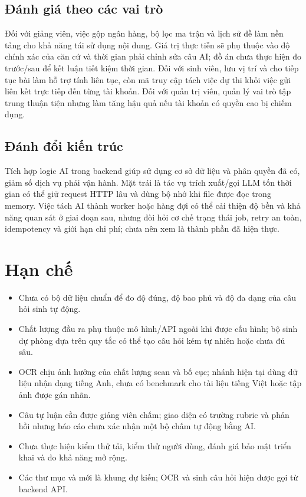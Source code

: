 \subsection{Đánh giá theo các vai trò}
Đối với giảng viên, việc gộp ngân hàng, bộ lọc ma trận và lịch sử đề làm
nền tảng cho khả năng tái sử dụng nội dung. Giá trị thực tiễn sẽ phụ thuộc
vào độ chính xác của căn cứ và thời gian phải chỉnh sửa câu AI; đồ án chưa
thực hiện đo trước/sau để kết luận tiết kiệm thời gian. Đối với sinh viên,
lưu vị trí và cho tiếp tục bài làm hỗ trợ tính liên tục, còn mã truy cập
tách việc dự thi khỏi việc gửi liên kết trực tiếp đến từng tài khoản.
Đối với quản trị viên, quản lý vai trò tập trung thuận tiện nhưng làm tăng
hậu quả nếu tài khoản có quyền cao bị chiếm dụng.

\subsection{Đánh đổi kiến trúc}
Tích hợp logic AI trong backend giúp sử dụng cơ sở dữ liệu và phân quyền
đã có, giảm số dịch vụ phải vận hành. Mặt trái là tác vụ trích xuất/gọi
LLM tốn thời gian có thể giữ request HTTP lâu và dùng bộ nhớ khi file được
đọc trong memory. Việc tách AI thành worker hoặc hàng đợi có thể cải thiện
độ bền và khả năng quan sát ở giai đoạn sau, nhưng đòi hỏi cơ chế trạng
thái job, retry an toàn, idempotency và giới hạn chi phí; chưa nên xem là
thành phần đã hiện thực.

\section{Hạn chế}

\begin{itemize}[leftmargin=1.6em, itemsep=3pt]
  \item Chưa có bộ dữ liệu chuẩn để đo độ đúng, độ bao phủ và độ đa dạng của
        câu hỏi sinh tự động.
  \item Chất lượng đầu ra phụ thuộc mô hình/API ngoài khi được cấu hình; bộ
        sinh dự phòng dựa trên quy tắc có thể tạo câu hỏi kém tự nhiên hoặc
        chưa đủ sâu.
  \item OCR chịu ảnh hưởng của chất lượng scan và bố cục; nhánh hiện tại
        dùng dữ liệu nhận dạng tiếng Anh, chưa có benchmark cho tài liệu
        tiếng Việt hoặc tập ảnh được gán nhãn.
  \item Câu tự luận cần được giảng viên chấm; giao diện có trường rubric và
        phản hồi nhưng báo cáo chưa xác nhận một bộ chấm tự động bằng AI.
  \item Chưa thực hiện kiểm thử tải, kiểm thử người dùng, đánh giá bảo mật
        triển khai và đo khả năng mở rộng.
  \item Các thư mục  và  mới là khung dự
        kiến; OCR và sinh câu hỏi hiện được gọi từ backend API.
\end{itemize}
